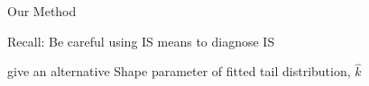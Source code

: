 \documentclass[14pt]{beamer}
\begin{document}


\begin{frame}{Our Method}
    \begin{outline}
        \1 Recall: Be careful using IS means to diagnose IS \newline
        
        \1 \citeauthor{Veh22} give an alternative
            \2 Shape parameter of fitted tail distribution, $\hat{k}$
    \end{outline}
\end{frame}



    

\end{document}

